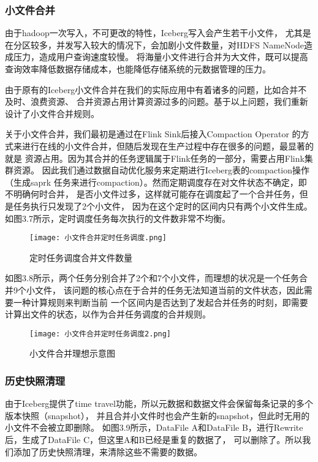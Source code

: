 \subsubsection{小文件合并}

由于hadoop一次写入，不可更改的特性，Iceberg写入会产生若干小文件，
尤其是在分区较多，并发写入较大的情况下，会加剧小文件数量，对HDFS NameNode造成压力，造成用户查询速度较慢。
将海量⼩⽂件进⾏合并为⼤⽂件，既可以提高查询效率降低数据存储成本，也能降低存储系统的元数据管理的压力。

由于原有的Iceberg小文件合并在我们的实际应用中有着诸多的问题，比如合并不及时、浪费资源、
合并资源占用计算资源过多的问题。基于以上问题，我们重新设计了小文件合并规则。

关于小文件合并，我们最初是通过在Flink Sink后接入Compaction Operator
的方式来进行在线的小文件合并，但随后发现在生产过程中存在很多的问题，最显著的就是
资源占用。因为其合并的任务逻辑属于Flink任务的一部分，需要占用Flink集群资源。
因此我们通过数据自动优化服务来定期进行Iceberg表的compaction操作（生成saprk
任务来进行compaction）。然而定期调度存在对文件状态不确定，即不明确何时合并，
是否小文件过多，这样就可能存在调度起了一个合并任务，但是任务执行只发现了2个小文件，
因为在这个定时的区间内只有两个小文件生成。如图3.7所示，定时调度任务每次执行的文件数非常不均衡。

\begin{figure}[h]
  \centering
  \texttt{[image: 小文件合并定时任务调度.png]}
  \caption{定时任务调度合并文件数量}
  \label{fig:badge}
\end{figure}

如图3.8所示，两个任务分别合并了2个和7个小文件，而理想的状况是一个任务合并9个小文件，
该问题的核心点在于合并的任务无法知道当前的文件状态，因此需要一种计算规则来判断当前
一个区间内是否达到了发起合并任务的时刻，即需要计算出文件的状态，以作为合并任务调度的合并规则。

\begin{figure}[h]
  \centering
  \texttt{[image: 小文件合并定时任务调度2.png]}
  \caption{小文件合并理想示意图}
  \label{fig:badge}
\end{figure}

\subsubsection{历史快照清理}

由于Iceberg提供了time travel功能，所以元数据和数据文件会保留每条记录的多个版本快照（snapshot），
并且合并小文件时也会产生新的snapshot，但此时无用的小文件不会被立即删除。
如图3.9所示，DataFile A和DataFile B，进行Rewrite后，生成了DataFile C，但这里A和B已经是重复的数据了，
可以删除了。所以我们添加了历史快照清理，来清除这些不需要的数据。

